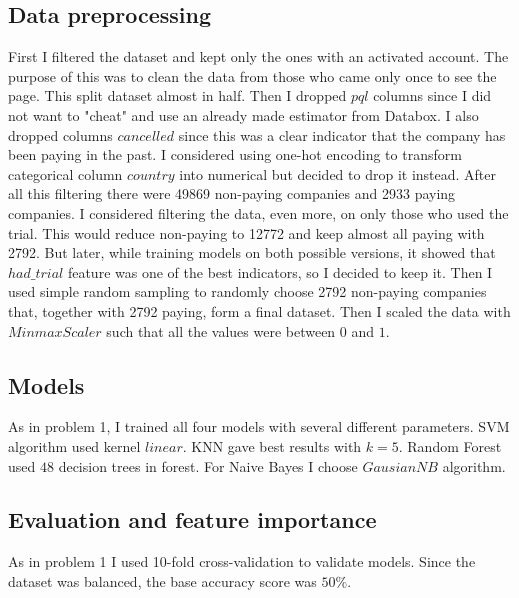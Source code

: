 \documentclass[fleqn,moreauthors,10pt]{ds_report}
\begin{document}
\subsection{Data preprocessing}
First I filtered the dataset and kept only the ones with an activated account. The purpose of this was to clean the data from those who came only once to see the page. This split dataset almost in half. Then I dropped $pql$ columns since I did not want to "cheat" and use an already made estimator from Databox. I also dropped columns $cancelled$ since this was a clear indicator that the company has been paying in the past. I considered using one-hot encoding to transform categorical column $country$ into numerical but decided to drop it instead. After all this filtering there were 49869 non-paying companies and  2933 paying companies. I considered filtering the data, even more, on only those who used the trial. This would reduce non-paying to 12772 and keep almost all paying with 2792. But later, while training models on both possible versions, it showed that $had\_trial$ feature was one of the best indicators, so I decided to keep it. Then I used simple random sampling to randomly choose 2792 non-paying companies that, together with 2792 paying, form a final dataset. Then I scaled the data with $MinmaxScaler$ such that all the values were between $0$ and $1$.



\subsection{Models}
As in problem 1, I trained all four models with several different parameters. SVM algorithm used kernel $linear$. KNN gave best results with $k=5$. Random Forest used $48$ decision trees in forest. For Naive Bayes I choose $GausianNB$ algorithm.


\subsection{Evaluation and feature importance}
As in problem 1 I used 10-fold cross-validation to validate models. Since the dataset was balanced, the base accuracy score was $50\%$. 
\end{document}
